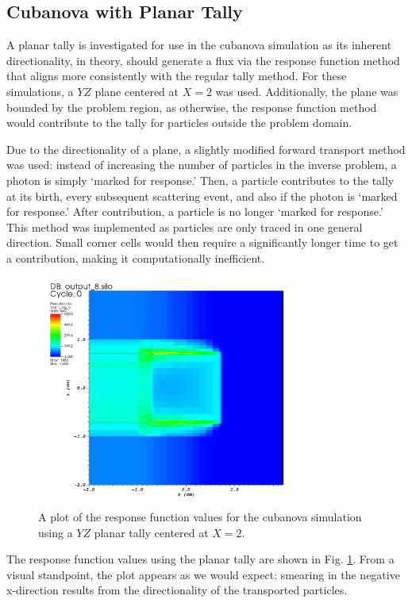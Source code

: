 \subsection{Cubanova with Planar Tally} \label{Sec: plane_tally}		
A planar tally is investigated for use in the cubanova simulation as its inherent directionality, in theory, should generate a flux via the response function method that aligns more consistently with the regular tally method. For these simulations, a $YZ$ plane centered at $X = 2$ was used. Additionally, the plane was bounded by the problem region, as otherwise, the response function method would contribute to the tally for particles outside the problem domain. 

Due to the directionality of a plane, a slightly modified forward transport method was used: instead of increasing the number of particles in the inverse problem, a photon is simply `marked for response.' Then, a particle contributes to the tally at its birth, every subsequent scattering event, and also if the photon is `marked for response.' After contribution, a particle is no longer `marked for response.' This method was implemented as particles are only traced in one general direction. Small corner cells would then require a significantly longer time to get a contribution, making it computationally inefficient.

\begin{figure} [h!]
	\centering
	\includegraphics[height=3in]{VarReduction/plots/plane_r_sig_a.png}
	\caption{A plot of the response function values for the cubanova simulation using a $YZ$ planar tally centered at $X=2$. }
	\label{fig:plane_r_sig_a}
\end{figure}

The response function values using the planar tally are shown in Fig. \ref{fig:plane_r_sig_a}. From a visual standpoint, the plot appears as we would expect: smearing in the negative x-direction results from the directionality of the transported particles.

